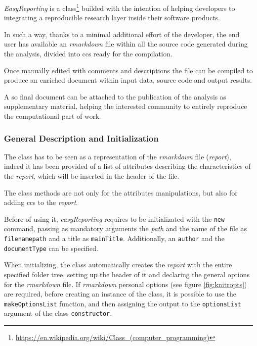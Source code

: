 \textit{EasyReporting} is a class\footnote{\url{https://en.wikipedia.org/wiki/Class_(computer_programming)}} builded with the intention of helping developers to integrating a reproducible research layer inside their software products.

In such a way, thanks to a minimal additional effort of the developer, the end user has available an \textit{rmarkdown} file within all the source code generated during the analysis, divided into \glspl{cc} ready for the compilation.

Once manually edited with comments and descriptions the file can be compiled to produce an enriched document within input data, source code and output results.

A so final document can be attached to the publication of the analysis as supplementary material, helping the interested community to entirely reproduce the computational part of work.

\subsubsection{General Description and Initialization}

The class has to be seen as a representation of the \textit{rmarkdown} file (\textit{report}), indeed it has been provided of a list of attributes describing the characteristics of the \textit{report}, which will be inserted in the header of the file.

The class methods are not only for the attributes manipulations, but also for adding \glspl{cc} to the \textit{report}.
 

Before of using it, \textit{easyReporting} requires to be initializated with the \lstinline!new! command, passing as mandatory arguments the \textit{path} and the name of the file as \lstinline!filenamepath! and a title as \lstinline!mainTitle!.
Additionally, an \lstinline!author! and the \lstinline!documentType! can be specified.

When initializing, the class automatically creates the \textit{report} with the entire specified folder tree, setting up the header of it and declaring the general options for the \textit{rmarkdown} file.
If \textit{rmarkdown} personal options (see figure \ref{fig:knitropts}) are required, before creating an instance of the class, it is possible to use the \lstinline!makeOptionsList! function, and then assigning the output to the \lstinline!optionsList! argument of the class \lstinline!constructor!.

